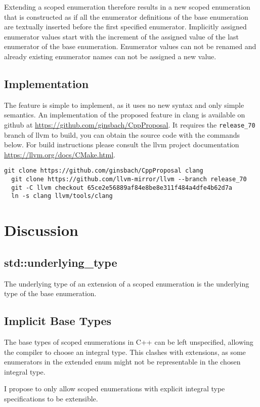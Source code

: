 \documentclass{scrartcl}
\begin{document}
Extending a scoped enumeration therefore results in a new scoped enumeration that is constructed as if all the enumerator definitions of the base enumeration are textually inserted before the first specified enumerator.
Implicitly assigned enumerator values start with the increment of the assigned value of the last enumerator of the base enumeration.
Enumerator values can not be renamed and already existing enumerator names can not be assigned a new value.

\subsection{Implementation}
The feature is simple to implement, as it uses no new syntax and only simple semantics.
An implementation of the proposed feature in clang is available on github at \url{https://github.com/ginsbach/CppProposal}.
It requires the \texttt{release\_70} branch of llvm to build, you can obtain the source code with the commands below.
For build instructions please consult the llvm project documentation \url{https://llvm.org/docs/CMake.html}.

{\footnotesize
\begin{lstlisting}[language={}]
  git clone https://github.com/ginsbach/CppProposal clang
  git clone https://github.com/llvm-mirror/llvm --branch release_70
  git -C llvm checkout 65ce2e56889af84e8be8e311f484a4dfe4b62d7a
  ln -s clang llvm/tools/clang
\end{lstlisting}}

\section{Discussion}
\subsection{std::underlying\_type}
The underlying type of an extension of a scoped enumeration is the underlying type of the base enumeration.

\subsection{Implicit Base Types}
The base types of scoped enumerations in C++ can be left unspecified, allowing
the compiler to choose an integral type.
This clashes with extensions, as some enumerators in the extended enum might not
be representable in the chosen integral type.

I propose to only allow scoped enumerations with explicit integral type
specifications to be extensible.
\end{document}
